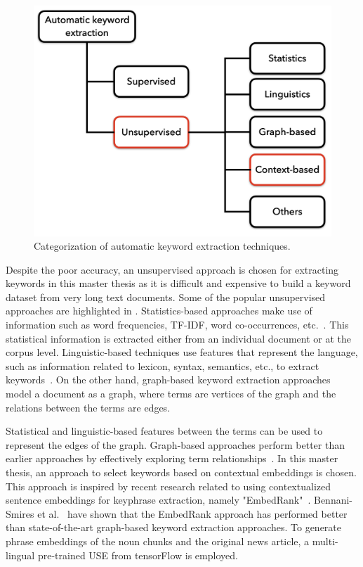 \begin{figure}[h]
	\centering
	\includegraphics[width=.6\textwidth]{images/thesis_images/keyword_extraction_techniques.png}
	\caption[Keyword extraction techniques.]{Categorization of automatic keyword extraction techniques. \label{fig:keyword_extraction_techniques}}
\end{figure}

Despite the poor accuracy, an unsupervised approach is chosen for extracting keywords in this master thesis as it is difficult and expensive to build a keyword dataset from very long text documents. Some of the popular unsupervised approaches are highlighted in . Statistics-based approaches make use of information such as word frequencies, \ac{TF-IDF}, word co-occurrences, etc.~\cite{beliga2014keyword}. This statistical information is extracted either from an individual document or at the corpus level. Linguistic-based techniques use features that represent the language, such as information related to lexicon, syntax, semantics, etc., to extract keywords~\cite{beliga2014keyword}. On the other hand, graph-based keyword extraction approaches model a document as a graph, where terms are vertices of the graph and the relations between the terms are edges. 

Statistical and linguistic-based features between the terms can be used to represent the edges of the graph. Graph-based approaches perform better than earlier approaches by effectively exploring term relationships~\cite{beliga2014keyword}. In this master thesis, an approach to select keywords based on contextual embeddings is chosen. This approach is inspired by recent research related to using contextualized sentence embeddings for keyphrase extraction, namely "EmbedRank"~\cite{bennani2018simple}. Bennani-Smires et al.~\cite{bennani2018simple} have shown that the EmbedRank approach has performed better than state-of-the-art graph-based keyword extraction approaches. To generate phrase embeddings of the noun chunks and the original news article, a multi-lingual pre-trained \ac{USE} from tensorFlow is employed. 


